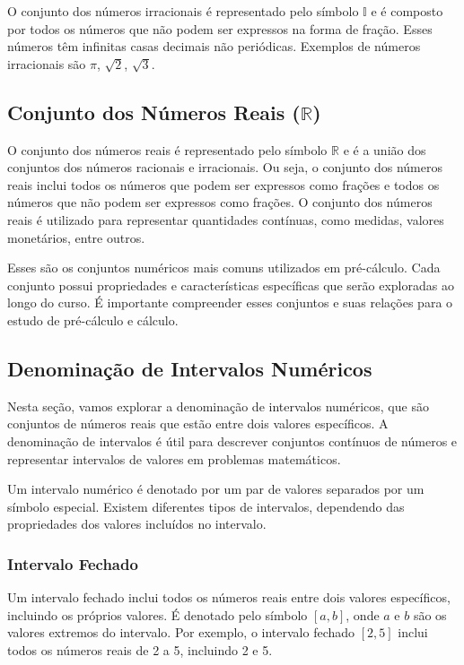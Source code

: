 \documentclass[12pt]{article}
\begin{document}
O conjunto dos números irracionais é representado pelo símbolo $\mathbb{I}$ e é composto por todos os números que não podem ser expressos na forma de fração. Esses números têm infinitas casas decimais não periódicas. Exemplos de números irracionais são $\pi$, $\sqrt{2}$, $\sqrt{3}$.

\subsection{Conjunto dos Números Reais ($\mathbb{R}$)}

O conjunto dos números reais é representado pelo símbolo $\mathbb{R}$ e é a união dos conjuntos dos números racionais e irracionais. Ou seja, o conjunto dos números reais inclui todos os números que podem ser expressos como frações e todos os números que não podem ser expressos como frações. O conjunto dos números reais é utilizado para representar quantidades contínuas, como medidas, valores monetários, entre outros.

Esses são os conjuntos numéricos mais comuns utilizados em pré-cálculo. Cada conjunto possui propriedades e características específicas que serão exploradas ao longo do curso. É importante compreender esses conjuntos e suas relações para o estudo de pré-cálculo e cálculo.


\subsection{Denominação de Intervalos Numéricos}

Nesta seção, vamos explorar a denominação de intervalos numéricos, que são conjuntos de números reais que estão entre dois valores específicos. A denominação de intervalos é útil para descrever conjuntos contínuos de números e representar intervalos de valores em problemas matemáticos.

Um intervalo numérico é denotado por um par de valores separados por um símbolo especial. Existem diferentes tipos de intervalos, dependendo das propriedades dos valores incluídos no intervalo.

\subsubsection{Intervalo Fechado}

Um intervalo fechado inclui todos os números reais entre dois valores específicos, incluindo os próprios valores. É denotado pelo símbolo $[a, b]$, onde $a$ e $b$ são os valores extremos do intervalo. Por exemplo, o intervalo fechado $[2, 5]$ inclui todos os números reais de 2 a 5, incluindo 2 e 5.
\end{document}
